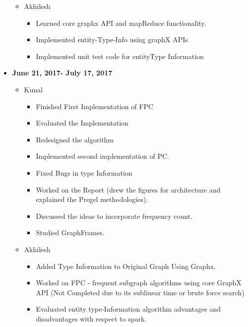 \documentclass{easychair}
\begin{document}
\begin{itemize}
\begin{itemize}
\begin{itemize}
 \end{itemize}

 \item Akhilesh
  \begin{itemize}
   \item Learned core graphx API and mapReduce functionality.
\item Implemented entity-Type-Info using graphX APIs
\item Implemented unit test code for entityType Information

 \end{itemize}

    \end{itemize}

     \item \textbf{June 21, 2017- July 17, 2017}
    \begin{itemize}

    \item Kunal
    \begin{itemize}
    \item Finished First Implementation of FPC
\item Evaluated the Implementation
\item Redesigned the algorithm
\item Implemented second implementation of PC.
\item Fixed Bugs in type Information
\item Worked on the  Report (drew the figures for architecture and explained the Pregel methodologies).
\item Discussed the ideas to incorporate frequency count.
\item Studied GraphFrames.

 \end{itemize}

 \item Akhilesh
  \begin{itemize}
   \item Added Type Information to Original Graph Using Graphx.
\item Worked on FPC - frequent subgraph algorithms using core GraphX API  (Not Completed due to its sublinear time or brute force search)
\item Evaluated entity type-Information algorithm advantages and disadvantages with respect to spark.

 \end{itemize}


\end{itemize}
\end{itemize}
\end{document}
